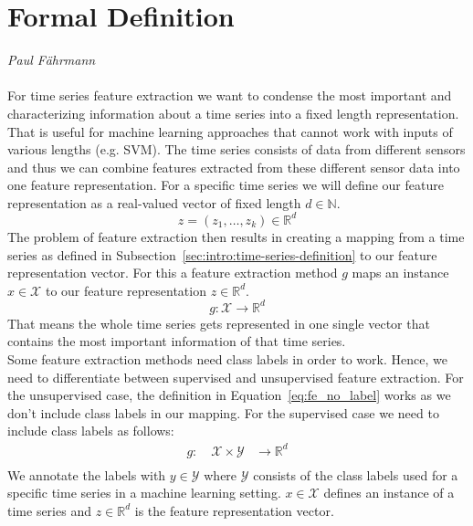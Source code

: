 \section{Formal Definition}
\label{sec:feature-extraction:formal-definition}
\vspace*{-15mm}
\hfill{\normalsize\emph{Paul Fährmann}}
\\\\
For time series feature extraction we want to condense the most important and characterizing information about a time series into a fixed length representation. That is useful for machine learning approaches that cannot work with inputs of various lengths (e.g. SVM). The time series consists of data from different sensors and thus we can combine features extracted from these different sensor data into one feature representation.
For a specific time series we will define our feature representation as a real-valued vector of fixed length $d \in \mathbb{N}$.
\begin{equation}
z = (z_1, \dots, z_k) \in \mathbb{R}^d
\end{equation}
The problem of feature extraction then results in creating a mapping from a time series as defined in Subsection~\ref{sec:intro:time-series-definition} to our feature representation vector.
For this a feature extraction method $g$ maps an instance $x\in\mathcal{X}$ to our feature representation $z\in\mathbb{R}^d$.
\begin{equation}
\label{eq:fe_no_label}
g: \mathcal{X} \longrightarrow \mathbb{R}^d
\end{equation}
That means the whole time series gets represented in one single vector that contains the most important information of that time series.\\
Some feature extraction methods need class labels in order to work. Hence, we need to differentiate between supervised and unsupervised feature extraction.
For the unsupervised case, the definition in Equation~\ref{eq:fe_no_label} works as we don't include class labels in our mapping. For the supervised case we need to include class labels as follows:
\begin{equation}
\begin{split}
g: \quad \mathcal{X}  \times\mathcal{Y} &\longrightarrow \mathbb{R}^d \\
\end{split}
\end{equation}
We annotate the labels with $y\in \mathcal{Y}$ where $\mathcal{Y}$ consists of the class labels used for a specific time series in a machine learning setting. $x\in\mathcal{X}$ defines an instance of a time series and $z\in\mathbb{R}^d$ is the feature representation vector.

